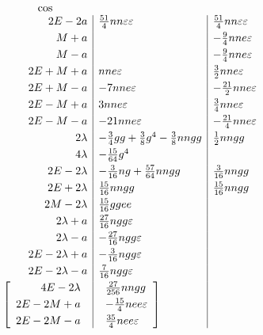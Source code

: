 \begingroup
\renewcommand{\thefootnote}{}
\endgroup
{}
\[
\begin{array}{r|l|l}
\multicolumn{1}{c}{\cos}&\multicolumn{1}{c}{}&\\
2E-2a&\tfrac{51}{4}nn\varepsilon\varepsilon&\tfrac{51}{4}nn\varepsilon\varepsilon\\[3pt]
M+a&&-\tfrac94nne\varepsilon\\[3pt]
M-a&&-\tfrac94nne\varepsilon\\[3pt]
2E+M+a&nne\varepsilon&\tfrac32nne\varepsilon\\[3pt]
2E+M-a&-7nne\varepsilon&-\tfrac{21}{2}nne\varepsilon\\[3pt]
2E-M+a&3nne\varepsilon&\tfrac34nne\varepsilon\\[3pt]
2E-M-a&-21nne\varepsilon&-\tfrac{21}{4}nne\varepsilon\\[3pt]
2\lambda&-\tfrac34gg+\tfrac38g^4-\tfrac38nngg&\tfrac12nngg\\[3pt]
4\lambda&-\tfrac{15}{64}g^4&\\[3pt]
2E-2\lambda&-\tfrac{3}{16}ng+\tfrac{57}{64}nngg&\tfrac{3}{16}nngg\\[3pt]
2E+2\lambda&\tfrac{15}{16}nngg&\tfrac{15}{16}nngg\\[3pt]
2M-2\lambda&\tfrac{15}{16}ggee&\\[3pt]
2\lambda+a&\tfrac{27}{16}ngg\varepsilon&\\[3pt]
2\lambda-a&-\tfrac{27}{16}ngg\varepsilon&\\[3pt]
2E-2\lambda+a&-\tfrac{3}{16}ngg\varepsilon&\\[3pt]
2E-2\lambda-a&\tfrac{7}{16}ngg\varepsilon&\\[3pt]
\left[\begin{array}{r}
4E-2\lambda\\[3pt]
2E-2M+a\\[3pt]
2E-2M-a
\end{array}\right.&
\left.\begin{array}{l}
\tfrac{27}{256}nngg\\[3pt]
-\tfrac{15}{4}nee\varepsilon\\[3pt]
\tfrac{35}{4}nee\varepsilon
\end{array}\right]&
\end{array}
\]
